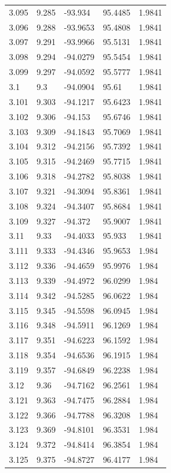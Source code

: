 \begin{tabular}{lllll}
3.095 & 9.285 & -93.934 & 95.4485 & 1.9841 \\
3.096 & 9.288 & -93.9653 & 95.4808 & 1.9841 \\
3.097 & 9.291 & -93.9966 & 95.5131 & 1.9841 \\
3.098 & 9.294 & -94.0279 & 95.5454 & 1.9841 \\
3.099 & 9.297 & -94.0592 & 95.5777 & 1.9841 \\
3.1 & 9.3 & -94.0904 & 95.61 & 1.9841 \\
3.101 & 9.303 & -94.1217 & 95.6423 & 1.9841 \\
3.102 & 9.306 & -94.153 & 95.6746 & 1.9841 \\
3.103 & 9.309 & -94.1843 & 95.7069 & 1.9841 \\
3.104 & 9.312 & -94.2156 & 95.7392 & 1.9841 \\
3.105 & 9.315 & -94.2469 & 95.7715 & 1.9841 \\
3.106 & 9.318 & -94.2782 & 95.8038 & 1.9841 \\
3.107 & 9.321 & -94.3094 & 95.8361 & 1.9841 \\
3.108 & 9.324 & -94.3407 & 95.8684 & 1.9841 \\
3.109 & 9.327 & -94.372 & 95.9007 & 1.9841 \\
3.11 & 9.33 & -94.4033 & 95.933 & 1.9841 \\
3.111 & 9.333 & -94.4346 & 95.9653 & 1.984 \\
3.112 & 9.336 & -94.4659 & 95.9976 & 1.984 \\
3.113 & 9.339 & -94.4972 & 96.0299 & 1.984 \\
3.114 & 9.342 & -94.5285 & 96.0622 & 1.984 \\
3.115 & 9.345 & -94.5598 & 96.0945 & 1.984 \\
3.116 & 9.348 & -94.5911 & 96.1269 & 1.984 \\
3.117 & 9.351 & -94.6223 & 96.1592 & 1.984 \\
3.118 & 9.354 & -94.6536 & 96.1915 & 1.984 \\
3.119 & 9.357 & -94.6849 & 96.2238 & 1.984 \\
3.12 & 9.36 & -94.7162 & 96.2561 & 1.984 \\
3.121 & 9.363 & -94.7475 & 96.2884 & 1.984 \\
3.122 & 9.366 & -94.7788 & 96.3208 & 1.984 \\
3.123 & 9.369 & -94.8101 & 96.3531 & 1.984 \\
3.124 & 9.372 & -94.8414 & 96.3854 & 1.984 \\
3.125 & 9.375 & -94.8727 & 96.4177 & 1.984 \\

\end{tabular}
